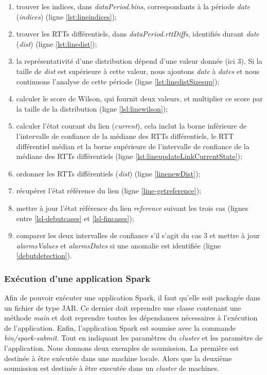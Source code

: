  \begin{enumerate}
 	\item trouver les indices,  dans \textit{dataPeriod.bins}, correspondants à la période \textit{date} (\textit{indices}) (ligne \ref{lst:lineindices});
 	
 	\item trouver les RTTs différentiels, dans \textit{dataPeriod.rttDiffs}, identifiés durant  \textit{date} (\textit{dist}) (ligne \ref{lst:linedist});
 	
 	\item la représentativité d'une distribution dépend d'une valeur donnée  (ici $3$), Si la taille de \textit{dist} est supérieure à cette valeur, nous ajoutons \textit{date} à \textit{dates} et nous continuons l'analyse de cette période (ligne \ref{lst:linedistSizesup});
 	\item calculer le score de Wilson, qui fournit deux valeurs, et multiplier ce score par la taille de la distribution  (ligne \ref{lsl:linewilson});
 	\item calculer l'état courant du lien (\textit{current}), cela inclut la borne inférieure de l'intervalle de confiance de la médiane des RTTs différentiels, le RTT différentiel médian et la borne supérieure de l'intervalle de confiance de la médiane des RTTs différentiels (ligne \ref{lst:lineupdateLinkCurrentState});
 	\item ordonner les RTTs différentiels (\textit{dist}) (ligne \ref{linenewDist});
 	\item récupérer l'état référence du lien (ligne \ref{line-getreference});
 	\item mettre à jour l'état référence du lien \textit{reference} suivant les trois cas (lignes entre \ref{lsl-debutcases} et \ref{lsl-fincases});
 	\item  comparer les deux intervalles de confiance s'il s'agit du cas $3$ et mettre à jour \textit{alarmsValues} et \textit{alarmsDates} si une anomalie est identifiée (ligne \ref{debutdetection}).
 	
 \end{enumerate}



\subsubsection{Exécution d'une application Spark} 

Afin de pouvoir exécuter une application Spark, il faut qu'elle soit packagée dans un fichier de type JAR. Ce dernier doit reprendre une classe contenant une méthode \textit{main} et doit reprendre toutes les dépendances nécessaires à l'exécution de l'application.  Enfin, l'application Spark  est soumise avec la commande \textit{bin/spark-submit}. Tout en indiquant les paramètres du \textit{cluster} et les paramètre de l'application. Nous donnons deux exemples de soumission. La première est destinée à être exécutée dans une machine locale. Alors que la deuxième soumission est destinée à être executée dans un \textit{cluster} de machines. 

